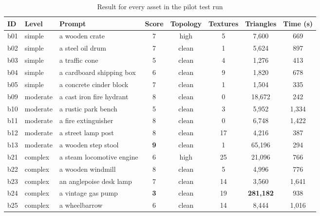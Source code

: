 \documentclass[conference]{IEEEtran}
\begin{document}
\begin{table}[t]
\centering
\caption{Result for every asset in the pilot test run}
\label{tab:perasset}
\small
\begin{tabular}{lllccccc}
\toprule
ID & Level & Prompt & Score & Topology & Textures & Triangles & Time (s) \\
\midrule
b01 & simple   & a wooden crate                 & 7 & high  & 5  & 7{,}600   & 669 \\
b02 & simple   & a steel oil drum               & 7 & clean & 1  & 5{,}624   & 897 \\
b03 & simple   & a traffic cone                 & 5 & clean & 4  & 1{,}276   & 413 \\
b04 & simple   & a cardboard shipping box       & 6 & clean & 9  & 1{,}820   & 678 \\
b05 & simple   & a concrete cinder block        & 7 & clean & 1  & 1{,}504   & 335 \\
b09 & moderate & a cast iron fire hydrant       & 8 & clean & 0  & 18{,}672  & 242 \\
b10 & moderate & a rustic park bench            & 5 & clean & 3  & 5{,}952   & 1{,}334 \\
b11 & moderate & a fire extinguisher            & 8 & clean & 0  & 6{,}748   & 1{,}422 \\
b12 & moderate & a street lamp post             & 8 & clean & 17 & 4{,}216   & 387 \\
b13 & moderate & a wooden step stool            & \textbf{9} & clean & 1  & 65{,}196  & 294 \\
b21 & complex  & a steam locomotive engine      & 6 & high  & 25 & 21{,}096  & 766 \\
b22 & complex  & a wooden windmill              & 8 & clean & 5  & 4{,}996   & 776 \\
b23 & complex  & an anglepoise desk lamp        & 7 & clean & 14 & 3{,}560   & 1{,}641 \\
b24 & complex  & a vintage gas pump             & \textbf{3} & clean & 19 & \textbf{281{,}182} & 938 \\
b25 & complex  & a wheelbarrow                  & 6 & clean & 14 & 8{,}444   & 1{,}016 \\
\bottomrule
\end{tabular}
\end{table}
\end{document}
